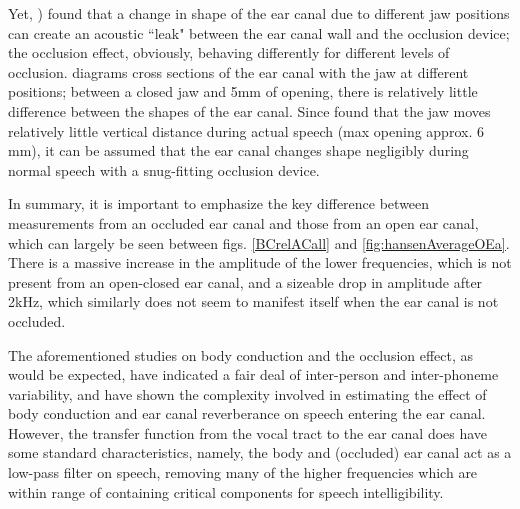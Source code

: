 \documentclass[dissertation,copyright]{uathesis}
\begin{document}
Yet, \cite{hansen:97b}) found that a change in shape of the ear canal due to different jaw positions can create an acoustic ``leak" between the ear canal wall and the occlusion device; the occlusion effect, obviously, behaving differently for different levels of occlusion. 
\cite{hansen:97b} diagrams cross sections of the ear canal with the jaw at different positions; between a closed jaw and 5mm of opening, there is relatively little difference between the shapes of the ear canal.  Since \cite{borghese:97} found that the jaw moves relatively little vertical distance during actual speech (max opening approx. 6 mm), it can be assumed that the ear canal changes shape negligibly during normal speech with a snug-fitting occlusion device. 

In summary, it is important to emphasize the key difference between measurements from an occluded ear canal and those from an open ear canal, which can largely be seen between figs. \ref{BCrelACall} and \ref{fig:hansenAverageOEa}.  There is a massive increase in the amplitude of the lower frequencies, which is not present from an open-closed ear canal, and a sizeable drop in amplitude after 2kHz, which similarly does not seem to manifest itself when the ear canal is not occluded.



The aforementioned studies on body conduction and the occlusion effect, as would be expected, have indicated a fair deal of inter-person and inter-phoneme variability, and have shown the complexity involved in estimating the effect of body conduction and ear canal reverberance on speech entering the ear canal.  However, the transfer function from the vocal tract to the ear canal does have some standard characteristics, namely, the body and (occluded) ear canal act as a low-pass filter on speech, removing many of the higher frequencies which are within range of containing critical components for speech intelligibility.



\end{document}
